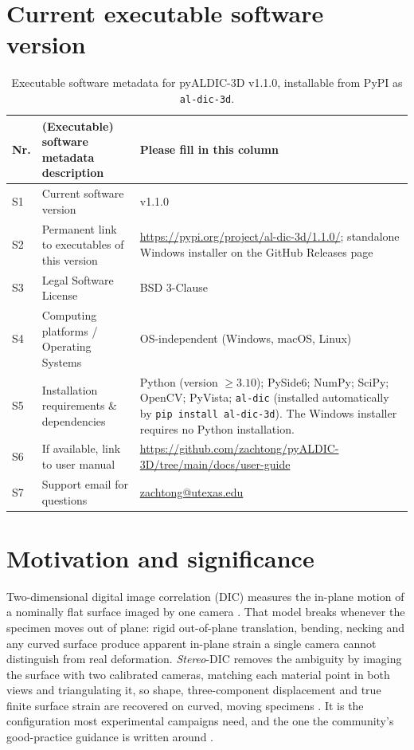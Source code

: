 \section*{Current executable software version}

\begin{table}[H]
\begin{tabular}{|l|>{\raggedright\arraybackslash}p{5cm}|>{\raggedright\arraybackslash}p{6.3cm}|}
\hline
\textbf{Nr.} & \textbf{(Executable) software metadata description} & \textbf{Please fill in this column} \\
\hline
S1 & Current software version & v1.1.0 \\
\hline
S2 & Permanent link to executables of this version & \url{https://pypi.org/project/al-dic-3d/1.1.0/}; standalone Windows installer on the GitHub Releases page \\
\hline
S3 & Legal Software License & BSD 3-Clause \\
\hline
S4 & Computing platforms / Operating Systems & OS-independent (Windows, macOS, Linux) \\
\hline
S5 & Installation requirements \& dependencies & Python (version $\geq 3.10$); PySide6; NumPy; SciPy; OpenCV; PyVista; \texttt{al-dic} (installed automatically by \texttt{pip install al-dic-3d}). The Windows installer requires no Python installation. \\
\hline
S6 & If available, link to user manual & \url{https://github.com/zachtong/pyALDIC-3D/tree/main/docs/user-guide} \\
\hline
S7 & Support email for questions & \href{mailto:zachtong@utexas.edu}{zachtong@utexas.edu} \\
\hline
\end{tabular}
\caption{Executable software metadata for pyALDIC-3D v1.1.0, installable from PyPI as \texttt{al-dic-3d}.}
\label{tab:software_metadata}
\end{table}

\section{Motivation and significance}
\label{sec:intro}

Two-dimensional digital image correlation (DIC) measures the in-plane motion of a nominally flat surface imaged by one camera \cite{sutton2009image,pan2018review}. That model breaks whenever the specimen moves out of plane: rigid out-of-plane translation, bending, necking and any curved surface produce apparent in-plane strain a single camera cannot distinguish from real deformation. \emph{Stereo}-DIC removes the ambiguity by imaging the surface with two calibrated cameras, matching each material point in both views and triangulating it, so shape, three-component displacement and true finite surface strain are recovered on curved, moving specimens \cite{sutton2009image,pan2017review3d}. It is the configuration most experimental campaigns need, and the one the community's good-practice guidance is written around \cite{idics2018gpg,reu2012stereorig1,reu2014calibration}.


